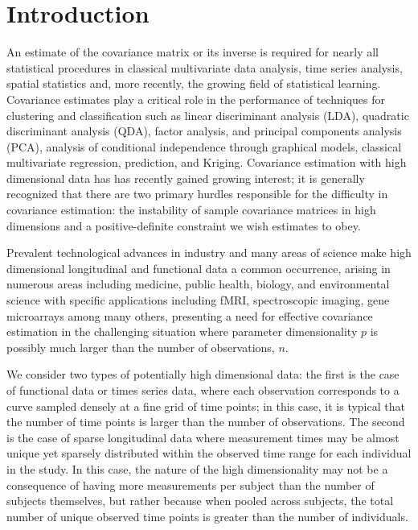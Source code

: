 \documentclass[12pt]{article}
\theoremstyle{definition}
\begin{document}
\section{Introduction}

\indent

An estimate of the covariance matrix or its inverse is required for nearly all statistical procedures in classical multivariate data analysis, time series analysis, spatial statistics and, more recently, the growing field of statistical learning. Covariance estimates play a critical role in the performance of techniques for clustering and classification such as linear discriminant analysis (LDA), quadratic discriminant analysis (QDA), factor analysis, and principal components analysis (PCA), analysis of conditional independence through graphical models, classical multivariate regression, prediction, and Kriging. Covariance estimation with high dimensional data has has recently gained growing interest; it is generally recognized that there are two primary hurdles responsible for the difficulty in covariance estimation: the instability of sample covariance matrices in high dimensions and a positive-definite constraint we wish estimates to obey.

Prevalent technological advances in industry and many areas of science make high dimensional longitudinal and functional data a common occurrence, arising in numerous areas including medicine, public health, biology, and environmental science with specific applications including fMRI, spectroscopic imaging, gene microarrays among many others, presenting a need for effective covariance estimation in the challenging situation where parameter dimensionality $p$ is possibly much larger than the number of observations, $n$. 

We consider two types of potentially high dimensional data: the first is the case of functional data or times series data, where each observation corresponds to a curve sampled densely at a fine grid of time points; in this case, it is typical that the number of time points is larger than the number of observations. The second is the case of sparse longitudinal data where measurement times may be almost unique yet sparsely distributed within the observed time range for each individual in the study. In this case, the nature of the high dimensionality may not be a consequence of having more measurements per subject than the number of subjects themselves, but rather because when pooled across subjects, the total number of unique observed time points is greater than the number of individuals. 
\end{document}
